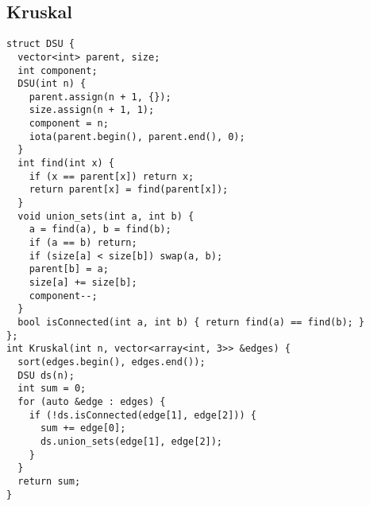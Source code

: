 \documentclass[twoside]{article}
\begin{document}
\begin{multicols*}{2}
{
\subsection*{Kruskal}
}
\begin{verbatim}
struct DSU {
  vector<int> parent, size;
  int component;
  DSU(int n) {
    parent.assign(n + 1, {});
    size.assign(n + 1, 1);
    component = n;
    iota(parent.begin(), parent.end(), 0);
  }
  int find(int x) {
    if (x == parent[x]) return x;
    return parent[x] = find(parent[x]);
  }
  void union_sets(int a, int b) {
    a = find(a), b = find(b);
    if (a == b) return;
    if (size[a] < size[b]) swap(a, b);
    parent[b] = a;
    size[a] += size[b];
    component--;
  }
  bool isConnected(int a, int b) { return find(a) == find(b); }
};
int Kruskal(int n, vector<array<int, 3>> &edges) {
  sort(edges.begin(), edges.end());
  DSU ds(n);
  int sum = 0;
  for (auto &edge : edges) {
    if (!ds.isConnected(edge[1], edge[2])) {
      sum += edge[0];
      ds.union_sets(edge[1], edge[2]);
    }
  }
  return sum;
}

\end{verbatim}

{
}
\end{multicols*}
\end{document}
